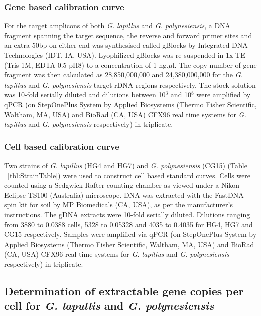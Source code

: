 \documentclass[12pt]{article}
\begin{document}
\subsubsection*{Gene based calibration curve}
For the target amplicons of both \emph{G. lapillus} and \emph{G. polynesiensis}, a DNA fragment spanning the target sequence, the reverse and forward primer sites and an extra 50bp on either end was synthesised called gBlocks \textsuperscript{\textregistered} by Integrated DNA Technologies (IDT, IA, USA). Lyophilized gBlocks \textsuperscript{\textregistered} was re-suspended in 1x TE (Tris 1M, EDTA 0.5 pH8) to a concentration of 1 ng.$\mu$l. The copy number of gene fragment was then calculated as 28,850,000,000 and 24,380,000,000 for the \textit{G. lapillus} and \textit{G. polynesiensis} target rDNA regions respectively.
The stock solution was 10-fold serially diluted and dilutions between 10$^{3}$ and 10$^{8}$ were amplified by qPCR (on StepOnePlus System by Applied Biosystems (Thermo Fisher Scientific, Waltham, MA, USA) and BioRad (CA, USA) CFX96 real time systems for \emph{G. lapillus} and \emph{G. polynesiensis} respectively) in triplicate.


\subsubsection*{Cell based calibration curve}
Two strains of \emph{G. lapillus} (HG4 and HG7) and \emph{G. polynesiensis} (CG15) (Table ~\ref{tbl:StrainTable}) were used to construct cell based standard curves. Cells were counted using a Sedgwick Rafter counting chamber as viewed under a Nikon Eclipse TS100 (Australia) microscope. DNA was extracted with the FastDNA spin kit for soil by MP Biomedicals (CA, USA), as per the manufacturer's instructions. The gDNA extracts were 10-fold serially diluted. Dilutions ranging from 3880 to 0.0388 cells, 5328 to 0.05328 and 4035 to 0.4035 for HG4, HG7 and CG15 respectively. Samples were amplified via qPCR (on StepOnePlus System by Applied Biosystems (Thermo Fisher Scientific, Waltham, MA, USA) and BioRad (CA, USA) CFX96 real time systems for \emph{G. lapillus} and \emph{G. polynesiensis} respectively) in triplicate.

\subsection*{Determination of extractable gene copies per cell for \emph{G. lapullis} and \emph{G. polynesiensis}}
\end{document}
